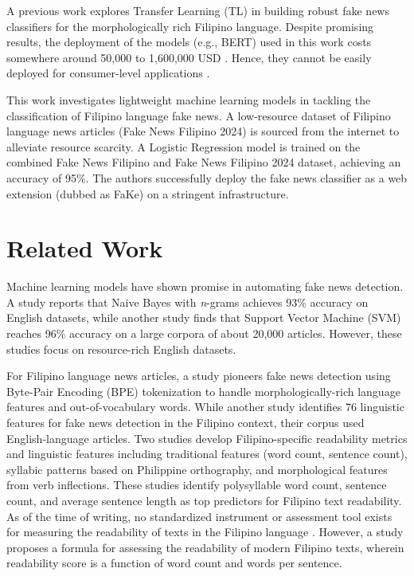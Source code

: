 \documentclass[conference]{IEEEtran}
\begin{document}
A previous work \cite{b3} explores Transfer Learning (TL) in building robust fake news classifiers for the morphologically rich Filipino language. Despite promising results, the deployment of the models (e.g., BERT) used in this work costs somewhere around 50,000 to 1,600,000 USD \cite{b4}. Hence, they cannot be easily deployed for consumer-level applications \cite{b3, b4}.

This work investigates lightweight machine learning models in tackling the classification of Filipino language fake news. A low-resource dataset of Filipino language news articles (Fake News Filipino 2024) is sourced from the internet to alleviate resource scarcity. A Logistic Regression model is trained on the combined Fake News Filipino and Fake News Filipino 2024 dataset, achieving an accuracy of 95\%. The authors successfully deploy the fake news classifier as a web extension (dubbed as FaKe) on a stringent infrastructure.

\section{Related Work}

Machine learning models have shown promise in automating fake news detection. A study \cite{b5} reports that Naive Bayes with \textit{n}-grams achieves 93\% accuracy on English datasets, while another study \cite{b6} finds that Support Vector Machine (SVM) reaches 96\% accuracy on a large corpora of about 20,000 articles. However, these studies focus on resource-rich English datasets.

For Filipino language news articles, a study \cite{b3} pioneers fake news detection using Byte-Pair Encoding (BPE) tokenization to handle morphologically-rich language features and out-of-vocabulary words. While another study \cite{b7} identifies 76 linguistic features for fake news detection in the Filipino context, their corpus used English-language articles. Two studies \cite{b8, b9} develop Filipino-specific readability metrics and linguistic features including traditional features (word count, sentence count), syllabic patterns based on Philippine orthography, and morphological features from verb inflections. These studies identify polysyllable word count, sentence count, and average sentence length as top predictors for Filipino text readability. As of the time of writing, no standardized instrument or assessment tool exists for measuring the readability of texts in the Filipino language \cite{b8}. However, a study \cite{b10} proposes a formula for assessing the readability of modern Filipino texts, wherein readability score is a function of word count and words per sentence.
\end{document}
